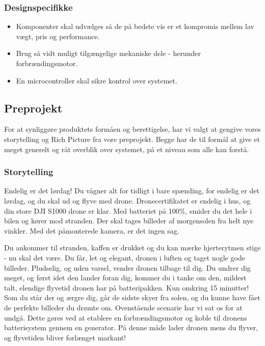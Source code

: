 \subsubsection{Designspecifikke }
\label{sec:designspecifikke-}

\begin{itemize}
\item Komponenter skal udvælges så de på bedste vis er et kompromis mellem lav vægt, pris og performance.
\item Brug så vidt muligt tilgængelige mekaniske dele - herunder forbrændingsmotor. 
\item En microcontroller skal sikre kontrol over systemet.
\end{itemize}

\subsection{Preprojekt}
\label{sec:preprojekt-}

For at synliggøre produktets formåen og berettigelse, har vi valgt at gengive vores storytelling og Rich Picture fra vore preprojekt. Begge har de til formål at give et meget generelt og råt overblik over systemet, på et niveau som alle kan forstå.

\subsubsection{Storytelling}
\label{sec:storytelling-}

Endelig er det lørdag! Du vågner alt for tidligt i bare spænding, for endelig er det lørdag, og du skal ud og flyve med drone. Dronecertifikatet er endelig i hus, og din store DJI S1000 drone er klar. Med batteriet på 100\%, smider du det hele i bilen og kører mod stranden. Der skal tages billeder af morgensolen fra helt nye vinkler. Med det påmonterede kamera, er det ingen sag.

Du ankommer til stranden, kaffen er drukket og du kan mærke hjerterytmen stige - nu skal det være. Du får, let og elegant, dronen i luften og taget nogle gode billeder. Pludselig, og uden varsel, vender dronen tilbage til dig. Du undrer dig meget, og først idet den lander foran dig, kommer du i tanke om den, mildest talt, elendige flyvetid dronen har på batteripakken. Kun omkring 15 minutter! Som du står der og ærgre dig, går de sidste skyer fra solen, og du kunne have fået de perfekte billeder du drømte om. 
Ovenstående scenarie har vi sat os for at undgå. Dette gøres ved at etablere en forbrændingsmotor og koble til dronens batterisystem gennem en generator. På denne måde lader dronen mens du flyver, og flyvetiden bliver forlænget markant!

